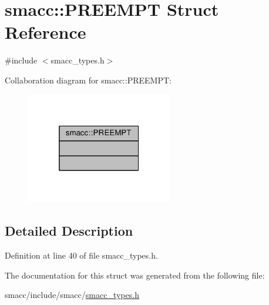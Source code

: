 \hypertarget{structsmacc_1_1PREEMPT}{}\section{smacc\+:\+:P\+R\+E\+E\+M\+PT Struct Reference}
\label{structsmacc_1_1PREEMPT}


{\ttfamily \#include $<$smacc\+\_\+types.\+h$>$}



Collaboration diagram for smacc\+:\+:P\+R\+E\+E\+M\+PT\+:
\nopagebreak
\begin{figure}[H]
\begin{center}
\leavevmode
\includegraphics[width=181pt]{structsmacc_1_1PREEMPT__coll__graph}
\end{center}
\end{figure}


\subsection{Detailed Description}


Definition at line 40 of file smacc\+\_\+types.\+h.



The documentation for this struct was generated from the following file\+:\begin{DoxyCompactItemize}
\item 
smacc/include/smacc/\hyperlink{smacc__types_8h}{smacc\+\_\+types.\+h}\end{DoxyCompactItemize}
